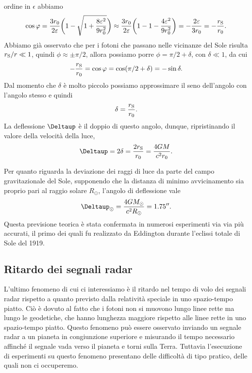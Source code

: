 ordine in $\epsilon$ abbiamo
\begin{equation}
  \cos\phi = \frac{3r_{0}}{2\epsilon}\bigg(1 - \sqrt{1 +
    \frac{8\epsilon^{2}}{9r_{0}^{2}}}\bigg) \approx \frac{3r_{0}}{2\epsilon}\bigg(1 - 1 -
  \frac{4\epsilon^{2}}{9r_{0}^{2}}\bigg) = -\frac{2\epsilon}{3r_{0}} =
  -\frac{r_{\textup{S}}}{r_{0}}.
\end{equation}
Abbiamo già osservato che per i fotoni che passano nelle vicinanze del Sole
risulta $r_{\textup{S}}/r \ll 1$, quindi $\phi \approx \pm \pi/2$, allora
possiamo porre $\phi = \pi/2 + \delta$, con $\delta \ll 1$, da cui
\begin{equation}
  -\frac{r_{\textup{S}}}{r_{0}} = \cos\phi = \cos(\pi/2 + \delta) = -\sin\delta.
\end{equation}
Dal momento che $\delta$ è molto piccolo possiamo approssimare il seno
dell'angolo con l'angolo stesso e quindi
\begin{equation}
  \delta = \frac{r_{\textup{S}}}{r_{0}}.
\end{equation}
La deflessione $\var$ è il doppio di questo angolo, dunque, ripristinando il
valore della velocità della luce,
\begin{equation}
  \var = 2\delta = \frac{2r_{\textup{S}}}{r_{0}} = \frac{4GM}{c^{2}r_{0}}.
\end{equation}

Per quanto riguarda la deviazione dei raggi di luce da parte del campo
gravitazionale del Sole, supponendo che la distanza di minimo avvicinamento sia
proprio pari al raggio solare $R_{\odot}$, l'angolo di deflessione vale
\begin{equation}
  \var_{\odot} = \frac{4GM_{\odot}}{c^{2}R_{\odot}} = \ang{;;1.75}.
\end{equation}
Questa previsione teorica è stata confermata in numerosi esperimenti via via più
accurati, il primo dei quali fu realizzato da Eddington durante l'eclissi totale
di Sole del 1919.

\subsection{Ritardo dei segnali radar}
\label{sec:ritardo-radar}

L'ultimo fenomeno di cui ci interessiamo è il ritardo nel tempo di volo dei
segnali radar rispetto a quanto previsto dalla relatività speciale in uno
spazio-tempo piatto.  Ciò è dovuto al fatto che i fotoni non si muovono lungo
linee rette ma lungo le geodetiche, che hanno lunghezza maggiore rispetto alle
linee rette in uno spazio-tempo piatto.  Questo fenomeno può essere osservato
inviando un segnale radar a un pianeta in congiunzione superiore e misurando il
tempo necessario affinché il segnale vada verso il pianeta e torni sulla Terra.
Tuttavia l'esecuzione di esperimenti su questo fenomeno presentano delle
difficoltà di tipo pratico, delle quali non ci occuperemo.

